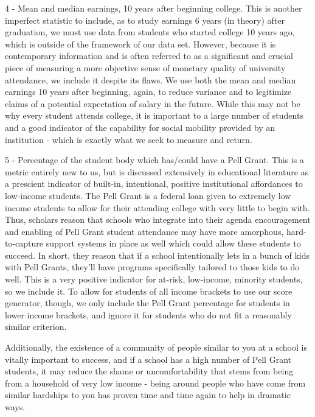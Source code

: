 \documentclass{article}
\begin{document}
4 - Mean and median earnings, 10 years after beginning college. This is another imperfect statistic to include, as to study earnings 6 years (in theory) after graduation, we must use data from students who started college 10 years ago, which is outside of the framework of our data set. However, because it is contemporary information and is often referred to as a significant and crucial piece of measuring a more objective sense of monetary quality of university attendance, we include it despite its flaws. We use both the mean and median earnings 10 years after beginning, again, to reduce variance and to legitimize claims of a potential expectation of salary in the future. While this may not be why every student attends college, it is important to a large number of students and a good indicator of the capability for social mobility provided by an institution - which is exactly what we seek to measure and return.

5 - Percentage of the student body which has/could have a Pell Grant. This is a metric entirely new to us, but is discussed extensively in educational literature as a prescient indicator of built-in, intentional, positive institutional affordances to low-income students. The Pell Grant is a federal loan given to extremely low income students to allow for their attending college with very little to begin with. Thus, scholars reason that schools who integrate into their agenda encouragement and enabling of Pell Grant student attendance may have more amorphous, hard-to-capture support systems in place as well which could allow these students to succeed. In short, they reason that if a school intentionally lets in a bunch of kids with Pell Grants, they'll have programs specifically tailored to those kids to do well. This is a very positive indicator for at-risk, low-income, minority students, so we include it. To allow for students of all income brackets to use our score generator, though, we only include the Pell Grant percentage for students in lower income brackets, and ignore it for students who do not fit a reasonably similar criterion. 

Additionally, the existence of a community of people similar to you at a school is vitally important to success, and if a school has a high number of Pell Grant students, it may reduce the shame or uncomfortability that stems from being from a household of very low income - being around people who have come from similar hardships to you has proven time and time again to help in dramatic ways.  
\end{document}

